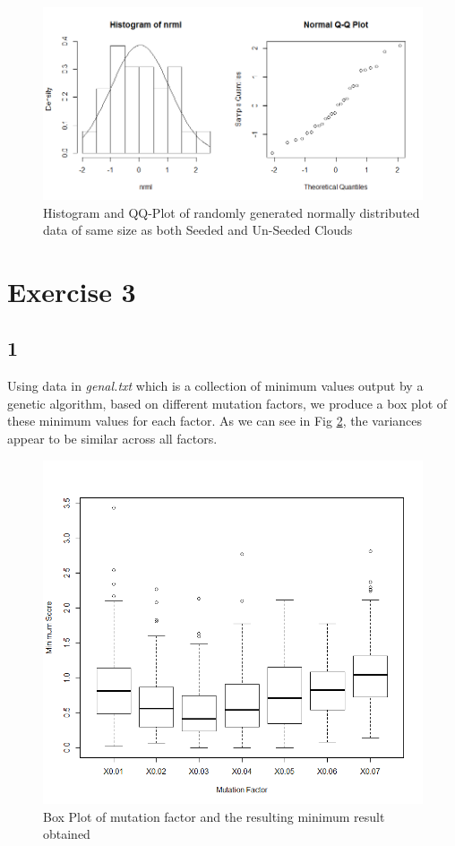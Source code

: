 \documentclass{article}
\begin{document}
    \begin{figure}[H]
      \includegraphics[scale=0.3]{../results/2_3_nrml.png}
      \caption{Histogram and QQ-Plot of randomly generated normally distributed data of same size as both Seeded and Un-Seeded Clouds}
      \label{fig:normal}
    \end{figure}
    
    \section{Exercise 3}
    \subsection*{1}
    Using data in \textit{genal.txt} which is a collection of minimum values output by a genetic algorithm, based on different mutation factors, we produce a box plot of these minimum values for each factor. As we can see in Fig \ref{fig:box}, the variances appear to be similar across all factors.
    
    \begin{figure}[H]
    \centering
      \includegraphics[scale=0.3]{../results/3_1.png}
      \caption{Box Plot of mutation factor and the resulting minimum result obtained}
      \label{fig:box}
    \end{figure}
    
\end{document}
